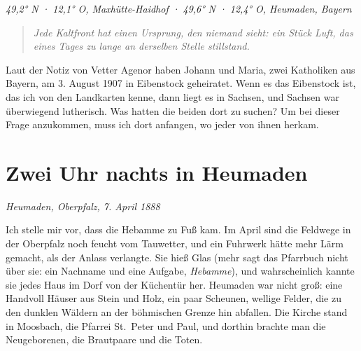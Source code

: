 \documentclass[
  ngerman,
  11pt,
  openany]{book}
\begin{document}
\emph{49,2° N · 12,1° O, Maxhütte-Haidhof · 49,6° N · 12,4° O, Heumaden,
Bayern}

\begin{quote}
\emph{Jede Kaltfront hat einen Ursprung, den niemand sieht: ein Stück
Luft, das eines Tages zu lange an derselben Stelle stillstand.}
\end{quote}

Laut der Notiz von Vetter Agenor haben Johann und Maria, zwei Katholiken
aus Bayern, am 3. August 1907 in Eibenstock geheiratet. Wenn es das
Eibenstock ist, das ich von den Landkarten kenne, dann liegt es in
Sachsen, und Sachsen war überwiegend lutherisch. Was hatten die beiden
dort zu suchen? Um bei dieser Frage anzukommen, muss ich dort anfangen,
wo jeder von ihnen herkam.

\section{Zwei Uhr nachts in Heumaden}\label{zwei-uhr-nachts-in-heumaden}

\emph{Heumaden, Oberpfalz, 7. April 1888}

Ich stelle mir vor, dass die Hebamme zu Fuß kam. Im April sind die
Feldwege in der Oberpfalz noch feucht vom Tauwetter, und ein Fuhrwerk
hätte mehr Lärm gemacht, als der Anlass verlangte. Sie hieß Glas (mehr
sagt das Pfarrbuch nicht über sie: ein Nachname und eine Aufgabe,
\emph{Hebamme}), und wahrscheinlich kannte sie jedes Haus im Dorf von
der Küchentür her. Heumaden war nicht groß: eine Handvoll Häuser aus
Stein und Holz, ein paar Scheunen, wellige Felder, die zu den dunklen
Wäldern an der böhmischen Grenze hin abfallen. Die Kirche stand in
Moosbach, die Pfarrei St.~Peter und Paul, und dorthin brachte man die
Neugeborenen, die Brautpaare und die Toten.
\end{document}
